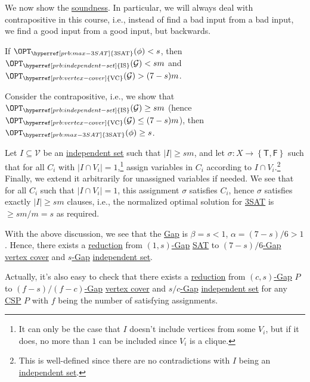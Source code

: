 We now show the \hyperref[def:soundness]{soundness}. In particular, we will always deal with contrapositive in this course, i.e., instead of find a bad input from a bad input, we find a good input from a good input, but backwards.

\begin{claim}
	If	\(\OPT_{\hyperref[prb:max-3SAT]{\text{3SAT}}} (\phi) < s\), then \(\OPT_{\hyperref[prb:independent-set]{\text{IS}} }(\mathcal{G} ) < sm\) and \(\OPT_{\hyperref[prb:vertex-cover]{\text{VC}} }(\mathcal{G} ) > (7-s)m\).
\end{claim}
\begin{explanation}
	Consider the contrapositive, i.e., we show that \(\OPT_{\hyperref[prb:independent-set]{\text{IS}} }(\mathcal{G} ) \geq sm\) (hence \(\OPT_{\hyperref[prb:vertex-cover]{\text{VC}} }(\mathcal{G} ) \leq (7-s)m\)), then \(\OPT_{\hyperref[prb:max-3SAT]{\text{3SAT}} }(\phi) \geq s\).

	Let \(I \subseteq \mathcal{V} \) be an \hyperref[def:independent-set]{independent set} such that \(\vert I \vert \geq sm\), and let \(\sigma \colon X \to \left\{ \textsf{T}, \textsf{F} \right\} \) such that for all \(C_i\) with \(\vert I \cap V_i \vert = 1\),\footnote{It can only be the case that \(I\) doesn't include vertices from some \(V_i\), but if it does, no more than \(1\) can be included since \(V_i\) is a clique.} assign variables in \(C_i\) according to \(I \cap V_i\).\footnote{This is well-defined since there are no contradictions with \(I\) being an \hyperref[def:independent-set]{independent set}.} Finally, we extend it arbitrarily for unassigned variables if needed. We see that for all \(C_i\) such that \(\vert I \cap  V_i \vert = 1\), this assignment \(\sigma \) satisfies \(C_i\), hence \(\sigma \) satisfies exactly \(\vert I \vert \geq sm\) clauses, i.e., the normalized optimal solution for \hyperref[prb:max-3SAT]{3SAT} is \(\geq sm/m = s\) as required.
\end{explanation}

With the above discussion, we see that the \hyperref[def:Gap]{Gap} is \(\beta = s < 1\), \(\alpha = (7-s) / 6 > 1\). Hence, there exists a \hyperref[def:reduction]{reduction} from \hyperref[def:c-s-Gap]{\((1, s)\)-Gap} \hyperref[prb:max-3SAT]{SAT} to \hyperref[def:Gap]{\((7 - s) / 6\)-Gap} \hyperref[prb:vertex-cover]{vertex cover} and \hyperref[def:Gap]{\(s\)-Gap} \hyperref[prb:independent-set]{independent set}.

\begin{remark}
	Actually, it's also easy to check that there exists a \hyperref[def:reduction]{reduction} from \hyperref[def:c-s-Gap]{\((c, s)\)-Gap} \(P\) to \hyperref[def:Gap]{\((f-s) / (f-c)\)-Gap} \hyperref[prb:vertex-cover]{vertex cover} and \hyperref[def:Gap]{\(s / c\)-Gap} \hyperref[def:independent-set]{independent set} for any \hyperref[prb:CSP]{CSP} \(P\) with \(f\) being the number of satisfying assignments.
\end{remark}

